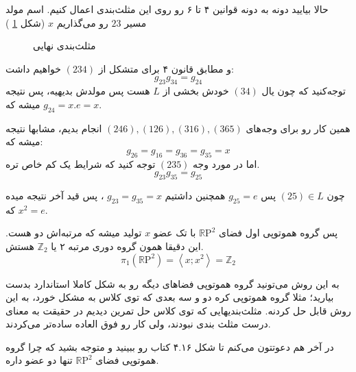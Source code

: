\documentclass[a4paper, 12pt]{article}
\begin{document}
  \noindent
  حالا بیایید دونه به دونه قوانین ۴ تا ۶ رو روی این مثلث‌بندی اعمال کنیم. اسم مولد مسیر 
  $23$
  رو می‌گذاریم 
  $x$
  (شکل 
  \ref{pic4}
  )
       \begin{figure}[h]
  	\caption{مثلث‌بندی نهایی	
  	}
  	\label{pic4}
  \end{figure}
  و مطابق قانون ۴ برای
  متشکل از 
  $(234)$
  خواهیم داشت:
  \[
  g_{23}g_{34} = g_{24}
  \]
  توجه‌کنید که چون یال 
  $(34)$
  خودش بخشی از 
  $L$
  هست پس مولدش بدیهیه، پس نتیجه میشه که 
  $g_{24} = x.e = x$.
  
  همین کار رو برای وجه‌های 
  $(246) , (126) , (316) , (365) $
  انجام بدیم، مشابها نتیجه میشه که:
  \begin{equation*}
  	g_{26} = g_{16} = g_{36} = g_{35} = x
  \end{equation*}
   اما در مورد وجه 
   $(235)$
   توجه کنید که شرایط یک کم خاص تره.
   \[
   g_{23}g_{35} = g_{25}
   \]
   
  چون
  $(25) \in L$
  پس 
  $g_{25} = e$
   همچنین داشتیم 
   $g_{23} = g_{35} = x$
   ، پس قید آخر نتیجه میده که $x^2=e$.
   
   پس گروه هموتوپی اول فضای 
  $\mathbb{R}\text{P}^2$
  با تک عضو 
  $x$ تولید میشه که مرتبه‌اش دو هست. این دقیقا همون گروه دوری مرتبه ۲ یا 
  $\mathbb{Z}_2$
  هستش.
  \[
  \pi_1(\mathbb{R}\text{P}^2) = \left < x;x^2\right > =   \mathbb{Z}_2
  \]
  
  
 به این روش می‌تونید گروه هموتوپی فضاهای دیگه رو به شکل کاملا استاندارد بدست بیارید؛ مثلا گروه هموتوپی کره دو و سه بعدی که توی کلاس  به مشکل خورد، به این روش قابل حل کردنه. 
 مثلث‌بندیهایی که توی کلاس حل تمرین دیدیم در حقیقت به معنای درست مثلث بندی نبودند، ولی کار رو فوق العاده ساده‌تر می‌کردند.
 
 در آخر هم دعوتتون می‌کنم تا شکل ۴.۱۶ کتاب رو ببینید و متوجه بشید که چرا گروه هموتوپی فضای 
 $\mathbb{R}\text{P}^2$
 تنها دو عضو داره.
  
  
  
\end{document}
